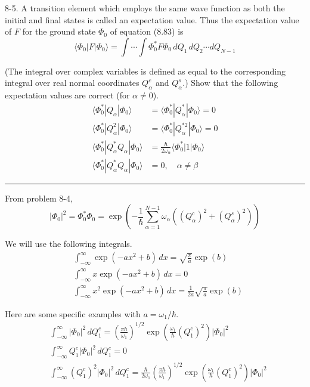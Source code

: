 \documentclass[12pt]{article}
\newcommand\U{\vert\Phi_0\vert^2}
\begin{document}
8-5.
A transition element which employs the same wave
function as both the initial and final states is called an expectation value.
Thus the expectation value of $F$ for the ground state $\Phi_0$ of
equation (8.83) is
\begin{equation*}
\langle\Phi_0|F|\Phi_0\rangle
=\int\cdots\int
\Phi_0^*F\Phi_0\,dQ_1\,dQ_2\cdots dQ_{N-1}
\tag{8.84}
\end{equation*}

(The integral over complex variables is defined as equal to the
corresponding integral over real normal coordinates $Q_\alpha^c$
and $Q_\alpha^s$.)
Show that the following expectation values are correct (for $\alpha\ne0$).
\begin{equation*}
\begin{aligned}
\langle\Phi_0^*|Q_\alpha|\Phi_0\rangle
&=\langle\Phi_0^*|Q_\alpha^*|\Phi_0\rangle=0
\\
\langle\Phi_0^*|Q_\alpha^2|\Phi_0\rangle
&=\langle\Phi_0^*|Q_\alpha^{*2}|\Phi_0\rangle=0
\\
\langle\Phi_0^*|Q_\alpha^*Q_\alpha|\Phi_0\rangle
&=\frac{\hbar}{2\omega_\alpha}\langle\Phi_0^*|1|\Phi_0\rangle
\\
\langle\Phi_0^*|Q_\alpha^*Q_\alpha|\Phi_0\rangle&=0,\quad\alpha\ne\beta
\end{aligned}
\tag{8.85}
\end{equation*}

\bigskip
\hrule

\bigskip
From problem 8-4,
\begin{equation*}
\U
=\Phi_0^*\Phi_0
=\exp\left(
-\frac{1}{\hbar}
\sum_{\alpha=1}^{N-1}
\omega_\alpha\left((Q_\alpha^c)^2+(Q_\alpha^s)^2\right)
\right)
\end{equation*}

We will use the following integrals.
\begin{align*}
&\int_{-\infty}^\infty\exp(-ax^2+b)\,dx=\sqrt{\frac{\pi}{a}}\exp(b)
\tag{1}
\\
&\int_{-\infty}^\infty x\exp(-ax^2+b)\,dx=0
\tag{2}
\\
&\int_{-\infty}^\infty x^2\exp(-ax^2+b)\,dx=\frac{1}{2a}\sqrt{\frac{\pi}{a}}\exp(b)
\tag{3}
\end{align*}

Here are some specific examples with $a=\omega_1/\hbar$.
\begin{align*}
&\int_{-\infty}^\infty
\U\,dQ_1^c=\left(\frac{\pi\hbar}{\omega_1}\right)^{1/2}
\exp\left(\frac{\omega_1}{\hbar}(Q_1^c)^2\right)
\U
\tag{4}
\\
&\int_{-\infty}^\infty Q_1^c
\U\,dQ_1^c=0
\tag{5}
\\
&\int_{-\infty}^\infty (Q_1^c)^2
\U\,dQ_1^c
=\frac{\hbar}{2\omega_1}
\left(\frac{\pi\hbar}{\omega_1}\right)^{1/2}
\exp\left(\frac{\omega_1}{\hbar}(Q_1^c)^2\right)
\U
\tag{6}
\end{align*}
\end{document}
